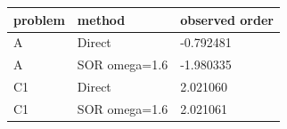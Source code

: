 \begin{tabular}{lll}
\toprule
problem & method & observed order \\
\midrule
A & Direct & -0.792481 \\
A & SOR omega=1.6 & -1.980335 \\
C1 & Direct & 2.021060 \\
C1 & SOR omega=1.6 & 2.021061 \\
\bottomrule
\end{tabular}
